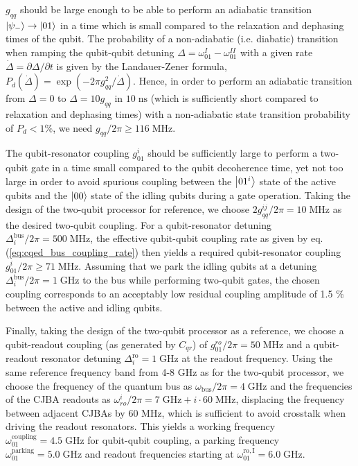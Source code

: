 \smallskip

$g_{qq}$ should be large enough to be able to perform an adiabatic transition $\left| \psi_- \right>\to\left| 01 \right>$ in a time which is small compared to the relaxation and dephasing times of the qubit. The probability of a non-adiabatic (i.e. diabatic) transition when ramping the qubit-qubit detuning $\Delta=\omega_{01}^I-\omega_{01}^{II}$ with a given rate $\dot{\Delta}=\partial \Delta/\partial t$ is given by the Landauer-Zener formula, $P_d(\dot{\Delta})=\exp{(-2\pi g_{qq}^2/\dot{\Delta})}$. Hence, in order to perform an adiabatic transition from $\Delta=0$ to $\Delta = 10g_{qq}$ in $10\;\mathrm{ns}$ (which is sufficiently short compared to relaxation and dephasing times) with a non-adiabatic state transition probability of $P_d<1\%$, we need $g_{qq}/2\pi\ge 116\;\mathrm{MHz}$.

\smallskip

The qubit-resonator coupling $g_{01}^i$ should be sufficiently large to perform a two-qubit gate in a time small compared to the qubit decoherence time, yet not too large in order to avoid spurious coupling between the $\left| 01^i \right>$ state of the active qubits and the $\left| 00 \right>$ state of the idling qubits during a gate operation. Taking the design of the two-qubit processor for reference, we choose $2g_{qq}^{ij}/2\pi = 10\;\mathrm{MHz}$ as the desired two-qubit coupling. For a qubit-resonator detuning $\Delta_i^\mathrm{bus}/2\pi=500\;\mathrm{MHz}$, the effective qubit-qubit coupling rate as given by eq. (\ref{eq:cqed_bus_coupling_rate}) then yields a required qubit-resonator coupling $g_{01}^i/2\pi\ge 71\;\mathrm{MHz}$. Assuming that we park the idling qubits at a detuning $\Delta_i^\mathrm{bus}/2\pi = 1\;\mathrm{GHz}$ to the bus while performing two-qubit gates, the chosen coupling corresponds to an acceptably low residual coupling amplitude of 1.5 \% between the active and idling qubits.

\smallskip

Finally, taking the design of the two-qubit processor as a reference, we choose a qubit-readout coupling (as generated by $C_{qr}$) of $g_{01}^{ro}/2\pi = 50\;\mathrm{MHz}$ and a qubit-readout resonator detuning $\Delta_i^\mathrm{ro}=1\;\mathrm{GHz}$ at the readout frequency. Using the same reference frequency band from 4-8 GHz as for the two-qubit processor, we choose the frequency of the quantum bus as $\omega_\mathrm{bus}/2\pi=4\;\mathrm{GHz}$ and the frequencies of the CJBA readouts as $\omega_{ro}^i/2\pi=7\;\mathrm{GHz}+i\cdot 60\;\mathrm{MHz}$, displacing the frequency between adjacent CJBAs by 60 MHz, which is sufficient to avoid crosstalk when driving the readout resonators. This yields a working frequency $\omega_{01}^\mathrm{coupling}=4.5\;\mathrm{GHz}$ for qubit-qubit coupling, a parking frequency $\omega_{01}^\mathrm{parking}=5.0\;\mathrm{GHz}$ and readout frequencies starting at $\omega_{01}^\mathrm{ro,I}=6.0\;\mathrm{GHz}$.

